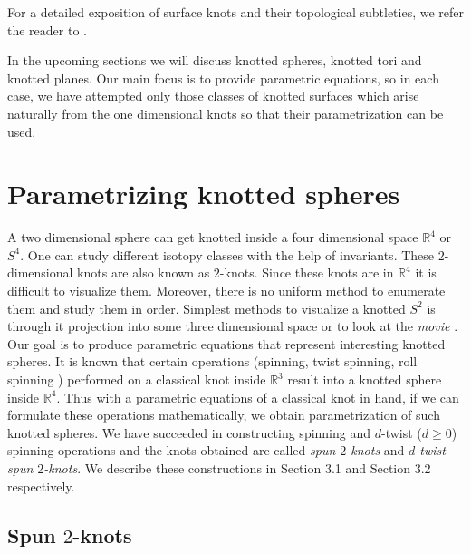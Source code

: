 \documentclass[10pt,a4paper,reqno]{amsart}
\theoremstyle{definition}
\theoremstyle{remark}
\begin{document}
For a detailed exposition of surface knots and their topological subtleties, we refer the reader to \cite{CarSai,Glu,Kam}. 

In the upcoming sections we will discuss knotted spheres, knotted tori and knotted planes.  Our main focus is to provide parametric equations, so in each case, we have attempted only those classes of knotted surfaces which arise naturally from the one dimensional knots so that their parametrization can be used.

\section{ Parametrizing  knotted spheres  } \label{sec:sphere}

A two dimensional sphere can get knotted inside a four dimensional space $\mathbb{R}^4$ or $S^4$. One can study different isotopy classes with the help of invariants.  These $2$-dimensional knots are also known as $2$-knots. Since these knots are in $\mathbb{R}^4$  it is difficult to visualize them. Moreover, there is no uniform method to enumerate them and study them in order.  Simplest methods to visualize a knotted $S^2$ is through it projection into some three dimensional space or to look at the {\it movie } \cite{CarSai}. Our goal is to produce parametric equations that represent interesting knotted spheres. It is known that certain  operations  (spinning, twist spinning, roll spinning \cite{Fox}) performed on a classical knot inside $\mathbb{R}^3$ result into a knotted sphere inside $\mathbb{R}^4$. Thus with a parametric equations of a classical knot in hand, if we can formulate these operations mathematically, we obtain parametrization of such knotted spheres. We have succeeded in constructing spinning and $d$-twist ($d\geq 0$) spinning operations and the knots obtained are called {\it spun $2$-knots} and {\it $d$-twist spun $2$-knots}. We describe these constructions in Section 3.1 and Section 3.2 respectively.


 
 \subsection{Spun $2$-knots}\label{sec:spin}
\end{document}
